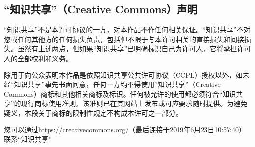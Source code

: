 \subsection{“知识共享”（Creative Commons）声明}
“知识共享”不是本许可协议的一方，对本作品不作任何相关保证。“知识共享”不对您或任何其他方的任何损失负责，包括但不限于与本许可相关的直接损失和间接损失。虽然有上述两点，但如果“知识共享”已明确标识自己为许可人，它将承担许可人的全部权利和义务。\par
除用于向公众表明本作品是依照知识共享公共许可协议（CCPL）授权以外，如未经“知识共享”事先书面同意，任何一方均不得使用“知识共享”（Creative Commons）商标和其他相关商标及标识。任何被允许的使用都必须符合“知识共享”的现行商标使用准则。该准则已在其网站上发布或可应要求随时提供。为避免疑义，本段关于商标的限制性规定不构成本许可之一部分。\par
您可以通过\url{https://creativecommons.org/}（最后连接于2019年6月23日10:57:40）联系“知识共享”